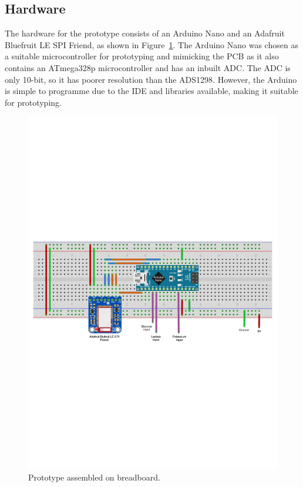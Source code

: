 \subsection{Hardware}
The hardware for the prototype consists of an Arduino Nano and an Adafruit Bluefruit LE SPI Friend, as shown in Figure~\ref{fig: breadboard}. The Arduino Nano was chosen as a suitable microcontroller for prototyping and mimicking the PCB as it also contains an ATmega328p microcontroller and has an inbuilt ADC. The ADC is only 10-bit, so it has poorer resolution than the ADS1298. However, the Arduino is simple to programme due to the IDE and libraries available, making it suitable for prototyping.

\begin{figure}[H]
\centering
\includegraphics[trim={0cm 10.5cm 0cm  10cm}, clip, width=1\textwidth]{./figures/Breadboard2.pdf}
\captionsetup{justification=centering}
\caption{Prototype assembled on breadboard.}
\label{fig: breadboard}
\end{figure}

